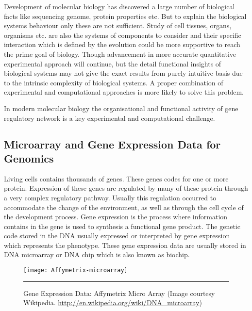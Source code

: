 Development of molecular biology has discovered a large number of biological facts like sequencing 
genome, protein properties etc. But to explain the biological systems behaviour only these are not sufficient.
Study of cell tissues, organs, organisms etc. are also the systems of components to consider and 
their specific interaction which is defined by the evolution could be more supportive to reach the 
prime goal of biology. Though advancement in more accurate quantitative experimental approach will 
continue, but the detail functional insights of biological systems may not give the exact results 
from purely intuitive basis due to the intrinsic complexity of biological systems. A proper 
combination of experimental and computational approaches is more likely to solve this problem.

In modern molecular biology the organisational and functional activity of gene regulatory network 
is a key experimental and computational challenge.


\subsection{Microarray and Gene Expression Data for Genomics }
Living cells contains thousands of genes. These genes codes for one or more protein. Expression of 
these genes are regulated by many of these protein through a very complex regulatory pathway.
Usually this regulation occurred to accommodate the change of the environment, as well as through 
the cell cycle of the development process. %
Gene expression is the process where information contains in the gene is used to synthesis a 
functional gene product. The genetic code stored in the DNA usually expressed or interpreted by 
gene expression which represents the  phenotype. 
These gene expression data are usually stored in DNA microarray or DNA chip which is also known as
biochip. 

\begin{figure}[htbp!]
	\centering
				\texttt{[image: Affymetrix-microarray]}
		\rule{35em}{0.5pt}
	\caption[Affymetrix Micro Array]{Gene Expression Data: Affymetrix Micro Array
	(Image courtesy Wikipedia. 
	\url{http://en.wikipedia.org/wiki/DNA_microarray})}
	\label{fig:Affymetrix-microarray}
	
\end{figure}
 
